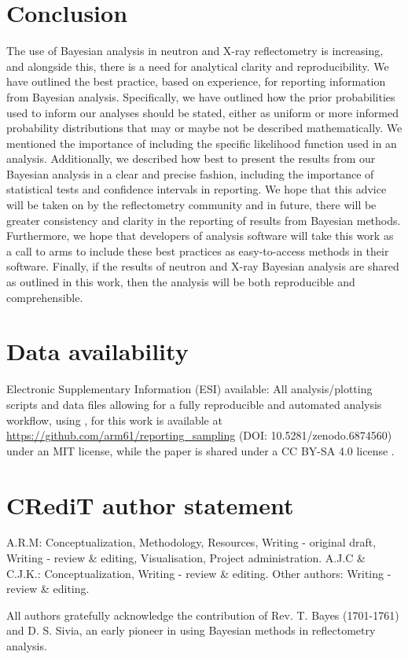 \documentclass[reprint,superscriptaddress,aps,amsmath,linenumbers]{revtex4-2}
\begin{document}
\section{Conclusion}
\label{sec:conclusions}

The use of Bayesian analysis in neutron and X-ray reflectometry is increasing, and alongside this, there is a need for analytical clarity and reproducibility. 
We have outlined the best practice, based on experience, for reporting information from Bayesian analysis. 
Specifically, we have outlined how the prior probabilities used to inform our analyses should be stated, either as uniform or more informed probability distributions that may or maybe not be described mathematically. 
We mentioned the importance of including the specific likelihood function used in an analysis. 
Additionally, we described how best to present the results from our Bayesian analysis in a clear and precise fashion, including the importance of statistical tests and confidence intervals in reporting.
We hope that this advice will be taken on by the reflectometry community and in future, there will be greater consistency and clarity in the reporting of results from Bayesian methods.
Furthermore, we hope that developers of analysis software will take this work as a call to arms to include these best practices as easy-to-access methods in their software.
Finally, if the results of neutron and X-ray Bayesian analysis are shared as outlined in this work, then the analysis will be both reproducible and comprehensible.

\section*{Data availability}

Electronic Supplementary Information (ESI) available: All analysis/plotting scripts and data files allowing for a fully reproducible and automated analysis workflow, using \showyourwork \cite{luger_showyourwork_2022,luger_mapping_2011}, for this work is available at \url{https://github.com/arm61/reporting_sampling} (DOI: 10.5281/zenodo.6874560) under an MIT license, while the paper is shared under a CC BY-SA 4.0 license \cite{mccluskey_github_2022}.

\section*{CR\lowercase{e}d\lowercase{i}T author statement}
\label{sec:credit}

A.R.M: Conceptualization, Methodology, Resources, Writing - original draft, Writing - review \& editing, Visualisation, Project administration.
A.J.C \& C.J.K.: Conceptualization, Writing - review \& editing.
Other authors: Writing - review \& editing.

\begin{acknowledgments}
    All authors gratefully acknowledge the contribution of Rev. T. Bayes (1701-1761) and D. S. Sivia, an early pioneer in using Bayesian methods in reflectometry analysis.
\end{acknowledgments}



\end{document}
